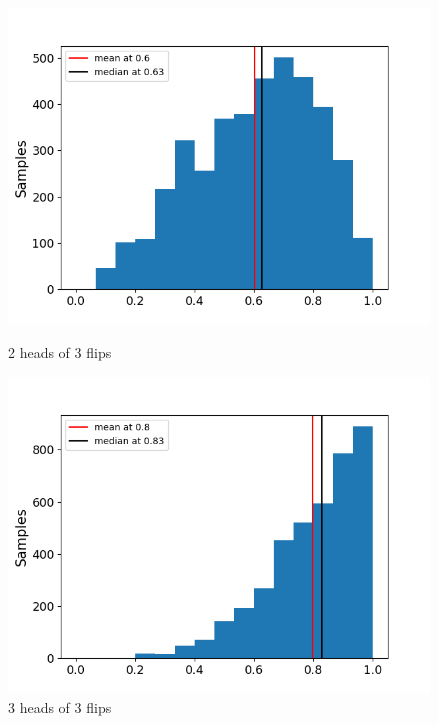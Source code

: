 \documentclass[a4paper,11pt]{article}
\theoremstyle{mytheor}
\begin{document}
    \begin{figure}[H]
    \centering
    \begin{minipage}{0.49\textwidth}
        \centering
        \includegraphics[width=0.995\textwidth]{Coins/coin_weightsc.png} %
        \caption{2 heads of 3 flips}
        \label{fig:2h}
    \end{minipage}
    \begin{minipage}{0.49\textwidth}
        \centering
        \includegraphics[width=0.995\textwidth]{Coins/coin_weights2c.png}         \caption{3 heads of 3 flips}
        \label{fig:3h}
    \end{minipage}
    
\end{figure}
    
\end{document}
